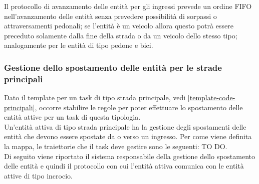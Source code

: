 Il protocollo di avanzamento delle entità per gli ingressi prevede un ordine FIFO nell'avanzamento delle entità senza prevedere possibilità di sorpassi o attraversamenti pedonali; se l'entità è un veicolo allora questo potrà essere preceduto solamente dalla fine della strada o da un veicolo dello stesso tipo; analogamente per le entità di tipo pedone e bici. 

\subsubsection{Gestione dello spostamento delle entità per le strade principali}
Dato il template per un task di tipo strada principale, vedi \ref{template-code-principali}, occorre stabilire le regole per poter effettuare lo spostamento delle entità attive per un task di questa tipologia.\\
Un'entità attiva di tipo strada principale ha la gestione degli spostamenti delle entità che devono essere spostate da o verso un ingresso. Per come viene definita la mappa, le traiettorie che il task deve gestire sono le seguenti: TO DO.\\
Di seguito viene riportato il sistema responsabile della gestione dello spostamento delle entità e quindi il protocollo con cui l'entità attiva comunica con le entità attive di tipo incrocio. 
